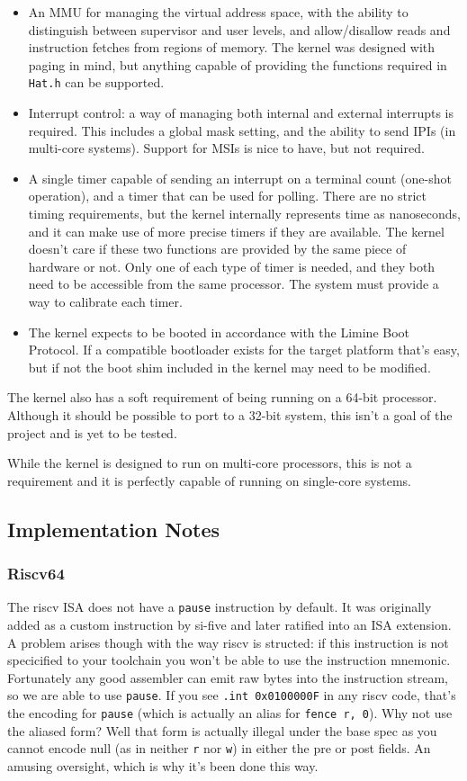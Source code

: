 \begin{itemize}
    \item An MMU for managing the virtual address space, with the ability to distinguish between supervisor and user levels, and allow/disallow reads and instruction fetches from regions of memory. The kernel was designed with paging in mind, but anything capable of providing the functions required in \verb|Hat.h| can be supported.
    \item Interrupt control: a way of managing both internal and external interrupts is required. This includes a global mask setting, and the ability to send IPIs (in multi-core systems). Support for MSIs is nice to have, but not required.
    \item A single timer capable of sending an interrupt on a terminal count (one-shot operation), and a timer that can be used for polling. There are no strict timing requirements, but the kernel internally represents time as nanoseconds, and it can make use of more precise timers if they are available. The kernel doesn't care if these two functions are provided by the same piece of hardware or not. Only one of each type of timer is needed, and they both need to be accessible from the same processor. The system must provide a way to calibrate each timer.
    \item The kernel expects to be booted in accordance with the Limine Boot Protocol. If a compatible bootloader exists for the target platform that's easy, but if not the boot shim included in the kernel may need to be modified.
\end{itemize}

The kernel also has a soft requirement of being running on a 64-bit processor. Although it should be possible to port to a 32-bit system, this isn't a goal of the project and is yet to be tested.

While the kernel is designed to run on multi-core processors, this is not a requirement and it is perfectly capable of running on single-core systems.

\subsection{Implementation Notes}

\subsubsection{Riscv64}
The riscv ISA does not have a \verb|pause| instruction by default. It was originally added as a custom instruction by si-five and later ratified into an ISA extension. A problem arises though with the way riscv is structed: if this instruction is not specicified to your toolchain you won't be able to use the instruction mnemonic. Fortunately any good assembler can emit raw bytes into the instruction stream, so we are able to use \verb|pause|. If you see \verb|.int 0x0100000F| in any riscv code, that's the encoding for \verb|pause| (which is actually an alias for \verb|fence r, 0|). Why not use the aliased form? Well that form is actually illegal under the base spec as you cannot encode null (as in neither \verb|r| nor \verb|w|) in either the pre or post fields. An amusing oversight, which is why it's been done this way.
